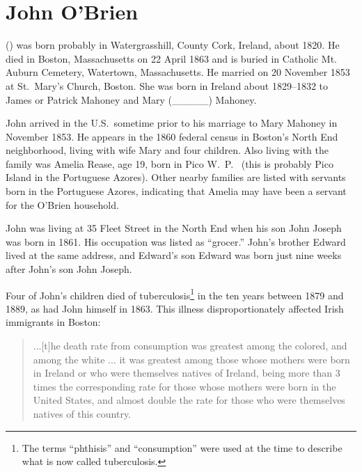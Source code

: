 \section{John O'Brien}

 () was born probably in Watergrasshill, County Cork, Ireland, about 1820.\cite{John2OBrienMarriage} He died in Boston, Massachusetts on 22 April 1863\cite{John2OBrienDeath} and is buried in Catholic Mt. Auburn Cemetery, Watertown, Massachusetts.\cite{BillMcEvoy} He married  on 20 November 1853 at St.\ Mary's Church, Boston.\cite{John2OBrienMarriage} She was born in Ireland about 1829\cite{John2OBrienCivilMarriage}--1832\cite{MaryMahoneyBowserMarriage} to James\cite{MaryMahoneyBowserMarriage} or Patrick\cite{John2OBrienCivilMarriage} Mahoney and Mary (\_\_\_\_\_)  Mahoney.\cite{John2OBrienCivilMarriage} 

John arrived in the U.S.\ sometime prior to his marriage to Mary Mahoney in November 1853. He appears in the 1860 federal census in Boston's North End neighborhood, living with wife Mary and four children. Also living with the family was Amelia Rease, age 19, born in Pico W.\ P.\ \cite{Census1860John} (this is probably Pico Island in the Portuguese Azores). Other nearby families are listed with servants born in the Portuguese Azores, indicating that Amelia may have been a servant for the O'Brien household.

John was living at 35 Fleet Street in the North End when his son John Joseph was born in 1861. His occupation was listed as ``grocer.''\cite{John3OBrienBirth,Wards} John's brother Edward lived at the same address, and Edward's son Edward was born just nine weeks after John's son John Joseph.\cite{John3OBrienBirth}

Four of John's children died of tuberculosis\footnote{The terms ``phthisis'' and ``consumption'' were used at the time to describe what is now called tuberculosis.\cite{TuberculosisHistory}} in the ten years between 1879 and 1889, as had John himself in 1863.\cite{John2OBrienDeath} This illness disproportionately affected Irish immigrants in Boston:

\begin{quote}
	...[t]he death rate from consumption was greatest among the colored, and among the white ... it was greatest among those whose mothers were born in Ireland or who were themselves natives of Ireland, being more than 3 times the corresponding rate for those whose mothers were born in the United States, and almost double the rate for those who were themselves natives of this country.\cite{VitalStatistics}
\end{quote}

